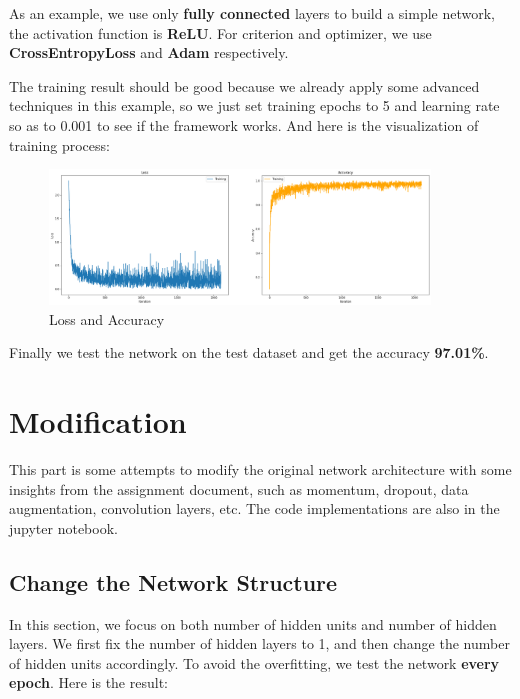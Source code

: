 \documentclass[a4paper, 11pt]{article} %
\begin{document}
As an example, we use only \textbf{fully connected} layers to build a simple network, the
activation function is \textbf{ReLU}. For criterion and optimizer, we use \textbf{CrossEntropyLoss}
and \textbf{Adam} respectively.

The training result should be good because we already apply some advanced techniques in
this example, so we just set training epochs to 5 and learning rate so as to 0.001 to see
if the framework works. And here is the visualization of training process:

\begin{figure}[H]
    \centering
    \includegraphics[width=0.9\textwidth]{./img/simple-board.png}
    \caption{Loss and Accuracy}
\end{figure}

Finally we test the network on the test dataset and get the accuracy \textbf{97.01\%}.

\bigskip


\section{\textbf{Modification}}

This part is some attempts to modify the original network architecture with some insights
from the assignment document, such as momentum, dropout, data augmentation, convolution
layers, etc. The code implementations are also in the jupyter notebook.

\subsection{\textbf{Change the Network Structure}}

In this section, we focus on both number of hidden units and number of hidden layers. We
first fix the number of hidden layers to 1, and then change the number of hidden units
accordingly. To avoid the overfitting, we test the network \textbf{every epoch}. Here is
the result:
\end{document}
